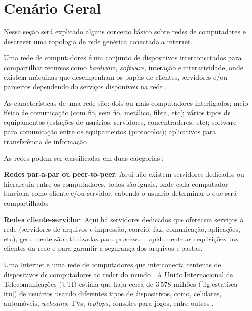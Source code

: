 \section{Cenário Geral} \label{sec:cenario-geral}

Nessa seção será explicado alguns conceito básico sobre redes de computadores e descrever uma topologia de rede genérica conectada a internet.

Uma rede de computadores é um conjunto de dispositivos interconectados para compartilhar recursos como \textit{hardware}, \textit{software}, interação e interatividade, onde existem máquinas que desempenham os papéis de clientes, servidores e/ou parceiros dependendo do serviços disponíveis na rede \cite{modelo:jose}.

As características de uma rede são: dois ou mais computadores interligados; meio físico de comunicação (com fio, sem fio, metálico, fibra, etc); vários tipos de equipamentos (estações de usuários, servidores, concentradores, etc); software para comunicação entre os equipamentos (protocolos); aplicativos para transferência de informação \cite{esr:arquitetura}.

As redes podem ser classificadas em duas categorias \cite{esr:arquitetura}: 
\begin{alineas}
\item \textbf{Redes par-a-par ou peer-to-peer}: Aqui não existem servidores dedicados ou hierarquia entre os computadores, todos são iguais, onde cada computador funciona como cliente e/ou servidor, cabendo o usuário determinar o que será compartilhado;
\item \textbf{Redes cliente-servidor}: Aqui há servidores dedicados que oferecem serviços à rede (servidores de arquivos e impressão, correio, fax, comunicação, aplicações, etc), geralmente são otimizadas para processar rapidamente as requisições dos clientes da rede e para garantir a segurança dos arquivos e pastas.
\end{alineas}


Uma Internet é uma rede de computadores que interconecta centenas de dispositivos de computadores ao redor do mundo \cite{redes:kurose}. A União Internacional de Telecomunicações (UTI) estima que haja cerca de 3.578 milhões (\autoref{fig:estatisca-itu}) de usuários usando diferentes tipos de dispositivos, como, celulares, automóveis, \textit{webcams}, TVs, \textit{laptops}, consoles para jogos, entre outros \cite{estatistica:itu}.

